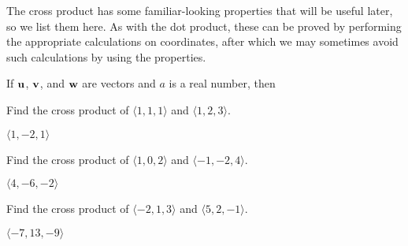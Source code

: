 The cross product has some familiar-looking properties that will be
useful later, so we list them here. As with the dot product, these can
be proved by performing the appropriate calculations on coordinates,
after which we may sometimes avoid such calculations by using the
properties. 

\begin{theorem}
If ${\bf u}$, ${\bf v}$, and ${\bf w}$ are vectors and $a$ is a real
number, then
\label{thm:cross product properties}


\begin{exercises}

\begin{exercise} Find the cross product of $\langle 1,1,1\rangle$ and 
$\langle 1,2,3\rangle$. 
\begin{answer} $\langle 1,-2,1\rangle$
\end{answer}\end{exercise}

\begin{exercise} Find the cross product of $\langle 1,0,2\rangle$ and 
$\langle -1,-2,4\rangle$. 
\begin{answer} $\langle 4,-6,-2\rangle$
\end{answer}\end{exercise}

\begin{exercise} Find the cross product of $\langle -2,1,3\rangle$ and 
$\langle 5,2,-1\rangle$. 
\begin{answer} $\langle -7,13,-9\rangle$
\end{answer}\end{exercise}


\end{exercises}
\end{theorem}
